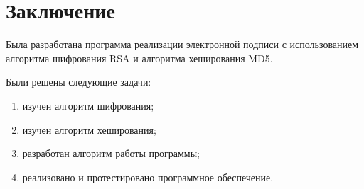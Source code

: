 \section*{Заключение}

Была разработана программа реализации электронной подписи с использованием
алгоритма шифрования RSA и алгоритма хеширования MD5.

Были решены следующие задачи:
\begin{enumerate}
    \item изучен алгоритм шифрования;
    \item изучен алгоритм хеширования;
    \item разработан алгоритм работы программы;
    \item реализовано и протестировано программное обеспечение.
\end{enumerate}

